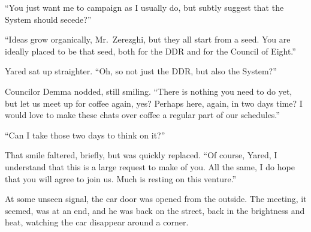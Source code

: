 ``You just want me to campaign as I usually do, but subtly suggest that the System should secede?''

``Ideas grow organically, Mr.~Zerezghi, but they all start from a seed. You are ideally placed to be that seed, both for the DDR and for the Council of Eight.''

Yared sat up straighter. ``Oh, so not just the DDR, but also the System?''

Councilor Demma nodded, still smiling. ``There is nothing you need to do yet, but let us meet up for coffee again, yes? Perhaps here, again, in two days time? I would love to make these chats over coffee a regular part of our schedules.''

``Can I take those two days to think on it?''

That smile faltered, briefly, but was quickly replaced. ``Of course, Yared, I understand that this is a large request to make of you. All the same, I do hope that you will agree to join us. Much is resting on this venture.''

At some unseen signal, the car door was opened from the outside. The meeting, it seemed, was at an end, and he was back on the street, back in the brightness and heat, watching the car disappear around a corner.
